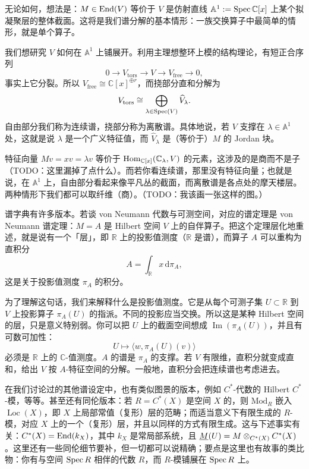 无论如何，想法是：$M\in\operatorname{End}(V)$ 等价于 $V$ 是仿射直线 $\mathbb{A}^1:=\operatorname{Spec}\mathbb{C}[x]$ 上某个拟凝聚层的整体截面。这将是我们谱分解的基本情形：一族交换算子中最简单的情形，就是单个算子。

我们想研究 $V$ 如何在 $\mathbb{A}^1$ 上铺展开。利用主理想整环上模的结构理论，有短正合序列
\[
0\longrightarrow V_{\mathrm{tors}}\longrightarrow V\longrightarrow V_{\mathrm{free}}\longrightarrow 0,
\]
事实上它分裂。所以 $V_{\mathrm{free}}\cong\mathbb{C}[x]^{\oplus r}$，而挠部分直和分解为
\[
V_{\mathrm{tors}}\cong\bigoplus_{\lambda\in\operatorname{Spec}(V)}\widehat{V}_\lambda.
\]
自由部分我们称为连续谱，挠部分称为离散谱。具体地说，若 $V$ 支撑在 $\lambda\in\mathbb{A}^1$ 处，这就是说 $\lambda$ 是一个广义特征值，而 $\widehat{V}_\lambda$ 是（等价于）$M$ 的 Jordan 块。

特征向量 $Mv=xv=\lambda v$ 等价于 $\operatorname{Hom}_{\mathbb{C}[x]}(\mathbb{C}_\lambda,V)$ 的元素，这涉及的是商而不是子（TODO：这里漏掉了点什么）。而若你看连续谱，那里没有特征向量；也就是说，在 $\mathbb{A}^1$ 上，自由部分看起来像平凡丛的截面，而离散谱是各点处的摩天楼层。两种情形下我们都可以取纤维（商）。（TODO：我该画一张这样的图。）


\begin{remark}
谱字典有许多版本。若谈 von Neumann 代数与可测空间，对应的谱定理是 von Neumann 谱定理：$M=A$ 是 Hilbert 空间 $V$ 上的自伴算子。把这个定理层化地重述，就是说有一个「层」，即 $\mathbb{R}$ 上的投影值测度（$\mathbb{R}$ 是谱），而算子 $A$ 可以重构为直积分
\[
A=\int_{\mathbb{R}}x\,\mathrm{d}\pi_A,
\]
这是关于投影值测度 $\pi_A$ 的积分。
\end{remark}

为了理解这句话，我们来解释什么是投影值测度。它是从每个可测子集 $U\subset\mathbb{R}$ 到 $V$ 上投影算子 $\pi_A(U)$ 的指派。不同的投影应当交换。所以这是某种 Hilbert 空间的层，只是意义特别弱。你可以把 $U$ 上的截面空间想成 $\operatorname{Im}(\pi_A(U))$，并且有可数可加性：
\[
U\longmapsto\langle w,\pi_A(U)(v)\rangle
\]
必须是 $\mathbb{R}$ 上的 $\mathbb{C}$-值测度。$A$ 的谱是 $\pi_A$ 的支撑。若 $V$ 有限维，直积分就变成直和，给出 $V$ 按 $A$-特征空间的分解。一般地，直积分会把连续谱也考虑进去。

在我们讨论过的其他谱设定中，也有类似图景的版本，例如 $C^*$-代数的 Hilbert $C^*$-模，等等。甚至还有同伦版本：若 $R=C^*(X)$ 是空间 $X$ 的，则 $\mathrm{Mod}_R$ 嵌入 $\operatorname{Loc}(X)$，即 $X$ 上局部常值（复形）层的范畴；而适当意义下有限生成的 $R$-模，对应 $X$ 上的一个（复形）层，并且以同样的方式有限生成。这与下述事实有关：$C^*(X)=\operatorname{End}(k_X)$，其中 $k_X$ 是常局部系统，且 $\underline{M}(U)=M\otimes_{C^*(X)}C^*(X)$。这里还有一些同伦细节要补，但一切都可以说精确；要点是这里也有故事的类比物：你有与空间 $\operatorname{Spec} R$ 相伴的代数 $R$，而 $R$-模铺展在 $\operatorname{Spec} R$ 上。

